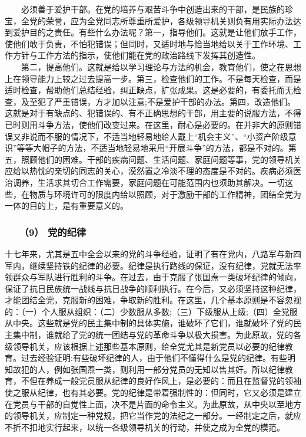 \documentclass[cn,11pt,chinese]{elegantbook}
\def\myformat#1{\hfil\hfil #1}
\begin{document}
　　必须善于爱护干部。在党的培养与艰苦斗争中创造出来的干部，是民族的珍宝，全党的荣誉，应为全党同志所尊重所爱护，各级领导机关则负有用实际办法达到爱护目的之责任。有些什么办法呢？第一，指导他们。这就是让他们放手工作，使他们敢于负责，不怕犯错误；但同时，又适时地与恰当地给以关于工作环境、工作方针与工作方法的指示，使他们能在党的政治路线下发挥其创造性。\\
　　第二，提高他们。这就是给以学习理论与方法的机会，教育他们，使之在思想上在领导能力上较之过去提高一步。第三，检查他们的工作。不是每天检查，而是适时检查，帮助他们总结经验，纠正缺点，扩张成果。这是必要的，有委托而无检查，及至犯了严重错误，方才加以注意;不是爱护干部的办法。第四，改造他们。这就是对于有缺点的、犯错误的、有不正确思想的干部，用主要的说服方法，不得已时则用斗争方法，使他们改变过来。在这里，耐心是必要的。在并非大的原则错误又非说而不服的情况下，不适当地轻易地给人戴上“机会主义”、“小资产阶级意识”等等大帽子的方法，不适当地轻易地采用“开展斗争”的方法，都是不对的。第五，照顾他们的困难。干部的疾病问题、生活问题、家庭问题等事，党的领导机关应给以热忱的亲切的同志的关心，漠然置之冷淡不理的态度是不对的。疾病必须医治调养，生活求其切合工作需要，家庭问题在可能范围内也须助其解决。一切这些，在物质与环境许可的限度内给以照顾，对于激励干部的工作精神，团结全党为一体的目的上，是有重要意义的。\\
\subsubsection*{\myformat{　　（9） 党的纪律}}
十七年来，尤其是五中全会以来的党的斗争经验，证明了有在党内，八路军与新四军内，继续坚持铁的纪律的必要。纪律是执行路线的保证，没有纪律，党就无法率领群众与军队进行胜利的斗争。在过去，由于克服了张国焘一类破坏纪律的倾向，保证了抗日民族统一战线与抗日战争的顺利执行。在今后，又必须坚持这种纪律，才能团结全党，克服新的困难，争取新的胜利。在这里，几个基本原则是不容忽视的：（一）个人服从组织：（二）少数服从多数;（三）下级服从上级;（四）全党服从中央。这些就是党的民主集中制的具体实施，谁破坏了它们，谁就破坏了党的民主集中制，谁就给了党的统一团结与党的革命斗争以极大损害。为此原故，党的各级领导机关，应该根据上述那些基本原则，给全党尤其是新党员以必要的纪律教育。过去经验证明:有些破坏纪律的人，由于他们不懂得什么是党的纪律。有些明知故犯的人，例如张国焘一类，则利用一部分党员的无知以售其奸。所以纪律教育，不但在养成一般党员服从纪律的良好作风上，是必要的：而且在监督党的领袖使之服从纪律，也有其必要。党的纪律是带着强制性的：但同时，它又必须是建立在党员与干部的自觉性上面，决不是片面的命令主义。为此原故，从中央以至地方的领导机关，应制定一种党规，把它当作党的法纪之一部分。一经制定之后，就应不折不扣地实行起来，以统一各级领导机关的行动，并使之成为全党的模范。\\
\end{document}
